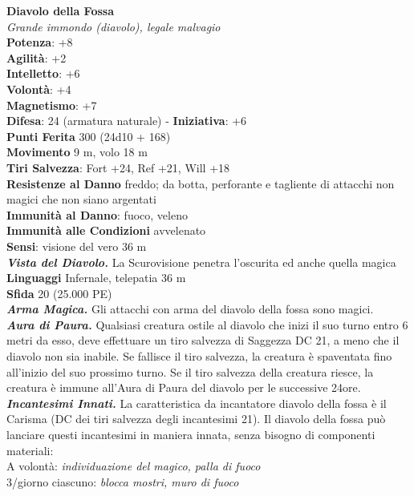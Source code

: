 \begin{multicols}{2}
\medskip\textbf{Diavolo della Fossa}\\
\emph{Grande immondo (diavolo), legale malvagio}\\
\textbf{Potenza}: +8\\
\textbf{Agilità}: +2\\
\textbf{Intelletto}: +6\\
\textbf{Volontà}: +4\\
\textbf{Magnetismo}: +7\\
\textbf{Difesa}: 24 (armatura naturale) - \textbf{Iniziativa}: +6\\
\textbf{Punti Ferita} 300 (24d10 + 168)\\
\textbf{Movimento} 9 m, volo 18 m\\
\textbf{Tiri Salvezza}: Fort +24, Ref +21, Will +18\\
\textbf{Resistenze al Danno} freddo; da botta, perforante e tagliente di attacchi non magici che non siano argentati\\
\textbf{Immunità al Danno}: fuoco, veleno\\
\textbf{Immunità alle Condizioni} avvelenato\\
\textbf{Sensi}: visione del vero 36 m\\
\emph{\textbf{Vista del Diavolo.}} La Scurovisione penetra l'oscurita ed anche quella magica\\
\textbf{Linguaggi} Infernale, telepatia 36 m\\ 
\textbf{Sfida} 20 (25.000 PE)\smallskip\\
\emph{\textbf{Arma Magica.}} Gli attacchi con arma del diavolo della fossa sono magici.\\
\emph{\textbf{Aura di Paura.}} Qualsiasi creatura ostile al diavolo che inizi il suo turno entro 6 metri da esso, deve effettuare un tiro salvezza di Saggezza DC 21, a meno che il diavolo non sia inabile. Se fallisce il tiro salvezza, la creatura è spaventata fino all'inizio del suo prossimo turno. Se il tiro salvezza della creatura riesce, la creatura è immune all'Aura di Paura del diavolo per le successive 24ore. \\
\emph{\textbf{Incantesimi Innati.}} La caratteristica da incantatore diavolo della fossa è il Carisma (DC dei tiri salvezza degli incantesimi 21). Il diavolo della fossa può lanciare questi incantesimi in maniera innata, senza bisogno di componenti materiali:\\
A volontà: \emph{individuazione del magico, palla di fuoco}\\
3/giorno ciascuno: \emph{blocca mostri, muro di fuoco}\\

\end{multicols}
